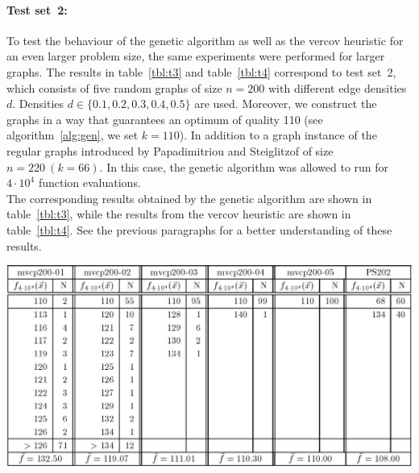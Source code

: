 \documentclass[12pt]{article}
\begin{document}
\paragraph{Test set~2:}
To test the behaviour of the genetic algorithm
as well as the vercov heuristic for an even
larger problem size, the same experiments
were performed for larger graphs.
The results in table~\ref{tbl:t3}
and table~\ref{tbl:t4} correspond to test set~2,
which consists of five random graphs of size
$n = 200$ with different edge densities $d$.
Densities $d \in \{0.1, 0.2, 0.3, 0.4, 0.5\}$ are used.
Moreover, we construct the graphs in a way that guarantees an optimum of quality 110
(see algorithm~\ref{alg:gen}, we set $k = 110$).
In addition to a graph instance of the regular graphs introduced by
Papadimitriou and Steiglitzof of size $n = 220 \ (k=66)$.
In this case, the genetic algorithm
was allowed to run for $4 \cdot 10^4$ function evaluations.\\
The corresponding results obtained by the
genetic algorithm are shown in table~\ref{tbl:t3}, while the results
from the vercov heuristic are shown in table~\ref{tbl:t4}.
See the previous paragraphs for a better understanding of these results.

\begin{table}[!htb]
\centering
\includegraphics[width=1\textwidth]{t3}
\caption[Results obtained by GA for graphs in test set~2]{%
Experimental results obtained by the genetic algorithm for five random graphs of size $n = 200$ with edge density: $d = 0.1$ (``mvcp200-01''), $d = 0.2$ (``mvcp200-02''), $d = 0.3$ (``mvcp200-03''), $d = 0.5$ (``mvcp200-04''), $d = 0.5$ (``mvcp200-05'') and the regular graph of size $n = 202 \ (k=66)$ from Papadimitriou and Steiglitz (``PS202'').%
}
\label{tbl:t3}
\end{table}
\end{document}

